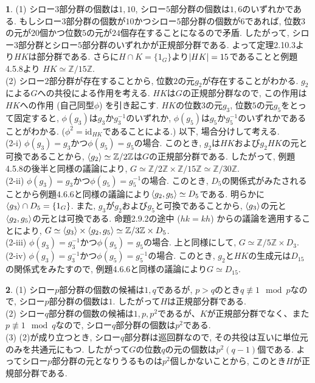 \documentclass{article}
\theoremstyle{definition}
\newtheorem{ans}{}
\numberwithin{ans}{subsection}
\DeclarePairedDelimiter{\gen}{\langle}{\rangle}
\DeclarePairedDelimiter{\order}{\lvert}{\rvert}
\begin{document}
\begin{ans}
  (1) シロー$3$部分群の個数は$1, 10$, シロー$5$部分群の個数は$1, 6$のいずれかである.
  もしシロー$3$部分群の個数が$10$かつシロー$5$部分群の個数が$6$であれば,
  位数$3$の元が$20$個かつ位数$5$の元が$24$個存在することになるので矛盾.
  したがって, シロー$3$部分群とシロー$5$部分群のいずれかが正規部分群である.
  よって定理2.10.3より$HK$は部分群である.
  さらに$H \cap K = \{1_G\}$より$\order{HK} = 15$であることと例題4.5.8より
  $HK \simeq \mathbb{Z}/15\mathbb{Z}$.\\
  (2) シロー$2$部分群が存在することから, 位数$2$の元$g_2$が存在することがわかる.
  $g_2$による$G$への共役による作用を考える.
  $HK$は$G$の正規部分群なので, この作用は$HK$への作用 (自己同型$\phi$) を引き起こす.
  $HK$の位数$3$の元$g_3$, 位数$5$の元$g_5$をとって固定すると,
  $\phi(g_3)$は$g_3$か$g_3^{-1}$のいずれか,
  $\phi(g_5)$は$g_5$か$g_5^{-1}$のいずれかであることがわかる. ($\phi^2 = \mathrm{id}_{HK}$であることによる.)
  以下, 場合分けして考える.\\
  (2-i) $\phi(g_3) = g_3$かつ$\phi(g_5) = g_5$の場合.
  このとき, $g_2$は$HK$および$g_2 HK$の元と可換であることから, $\gen{g_2} \simeq \mathbb{Z}/2\mathbb{Z}$は$G$の正規部分群である.
  したがって, 例題4.5.8の後半と同様の議論により, $G \simeq \mathbb{Z}/2\mathbb{Z} \times \mathbb{Z}/15\mathbb{Z} \simeq \mathbb{Z}/30\mathbb{Z}$.\\
  (2-ii) $\phi(g_3) = g_3$かつ$\phi(g_5) = g_5^{-1}$の場合.
  このとき, $D_5$の関係式がみたされることから例題4.6.6と同様の議論により$\gen{g_2, g_5} \simeq D_5$である.
  明らかに$\gen{g_3} \cap D_5 = \{1_G\}$.
  また, $g_3$が$g_2$および$g_5$と可換であることから,
  $\gen{g_3}$の元と$\gen{g_2, g_5}$の元とは可換である.
  命題2.9.2の途中 ($hk = kh$) からの議論を適用することにより, $G \simeq \gen{g_3} \times \gen{g_2, g_5} \simeq \mathbb{Z}/3\mathbb{Z} \times D_5$.\\
  (2-iii) $\phi(g_3) = g_3^{-1}$かつ$\phi(g_5) = g_5$の場合.
  上と同様にして, $G \simeq \mathbb{Z}/5\mathbb{Z} \times D_3$.\\
  (2-iv) $\phi(g_3) = g_3^{-1}$かつ$\phi(g_5) = g_5^{-1}$の場合.
  このとき, $g_2$と$HK$の生成元は$D_{15}$の関係式をみたすので, 例題4.6.6と同様の議論により$G \simeq D_{15}$.\\
\end{ans}

\begin{ans}
  (1) シロー$p$部分群の個数の候補は$1, q$であるが, $p > q$のとき$q \not\equiv 1 \mod p$なので, シロー$p$部分群の個数は$1$.
  したがって$H$は正規部分群である. \\
  (2) シロー$q$部分群の個数の候補は$1, p, p^2$であるが、$K$が正規部分群でなく、また$p \not\equiv 1 \mod q$なので,
  シロー$q$部分群の個数は$p^2$である. \\
  (3) (2)が成り立つとき, シロー$q$部分群は巡回群なので, その共役は互いに単位元のみを共通元にもつ.
  したがって$G$の位数$q$の元の個数は$p^2(q - 1)$個である. よってシロー$p$部分群の元となりうるものは$p^2$個しかないことから,
  このとき$H$が正規部分群である.
\end{ans}
\end{document}
